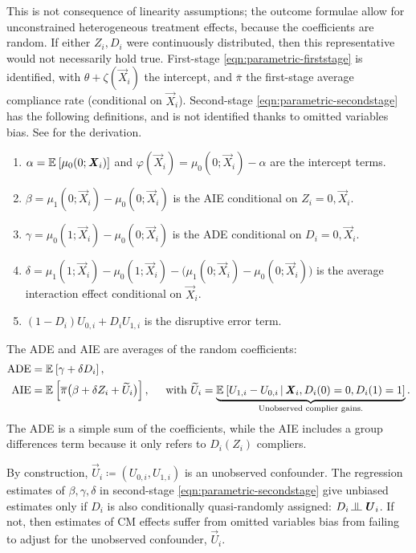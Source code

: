 This is not consequence  of linearity assumptions; the outcome formulae allow for unconstrained heterogeneous treatment effects, because the coefficients are random.
If either $Z_i, D_i$ were continuously distributed, then this representative would not necessarily hold true.
First-stage \eqref{eqn:parametric-firststage} is identified, with $\theta + \zeta(\vec X_i)$ the intercept, and $\bar \pi$ the first-stage average compliance rate (conditional on $\vec X_i$).
Second-stage \eqref{eqn:parametric-secondstage} has the following definitions, and is not identified thanks to omitted variables bias.
See  for the derivation.
\begin{enumerate}[label=\textbf{(\alph*)}]
    \item $\alpha = \mathbb{E}_{} \left[ \mu_0(0; \boldsymbol{\mathit{X}}_i) \right]$ and $\varphi(\vec X_i) = \mu_0(0; \vec X_i) - \alpha$ are the intercept terms.
    \item $\beta = \mu_1(0; \vec X_i) - \mu_0(0; \vec X_i)$ is the AIE conditional on $Z_i = 0, \vec X_i$.
    \item $\gamma = \mu_0(1; \vec X_i) - \mu_0(0; \vec X_i)$ is the ADE conditional on $D_i = 0, \vec X_i$.
    \item $\delta = \mu_1(1; \vec X_i) - \mu_0(1; \vec X_i) - \big( \mu_1(0; \vec X_i) - \mu_0(0; \vec X_i) \big)$ is the average interaction effect conditional on $\vec X_i$.
    \item $\left( 1 - D_i \right) U_{0,i} + D_i U_{1,i}$ is the disruptive error term.
\end{enumerate}

The ADE and AIE are averages of the random coefficients:
\begin{align*}
    \text{ADE}
        &= \mathbb{E}_{} \left[ \gamma + \delta D_i \right], \\
    \text{AIE}
        &= \mathbb{E}_{} \left[  \overline{\pi} \big( \beta +  \delta Z_i + \widetilde{U}_i \big) \right],
        \;\;\;\; \text{ with } \widetilde{U}_i
            = \underbrace{\mathbb{E}_{} \left[  U_{1,i} - U_{0,i} \, \middle\vert \, 
                \boldsymbol{\mathit{X}}_i, D_i(0) = 0, D_i(1) = 1 \right]}_{
                    \text{Unobserved complier gains.}}.
\end{align*}
The ADE is a simple sum of the coefficients, while the AIE includes a group differences term because it only refers to $D_i(Z_i)$ compliers.

By construction, $\vec U_i \coloneqq \left(U_{0, i}, U_{1, i} \right)$ is an unobserved confounder.
The regression estimates of $\beta, \gamma, \delta$ in second-stage \eqref{eqn:parametric-secondstage} give unbiased estimates only if $D_i$ is also conditionally quasi-randomly assigned: $D_i \indep  \vec U_{i} $.
If not, then estimates of CM effects suffer from omitted variables bias from failing to adjust for the unobserved confounder, $\vec U_i$.

